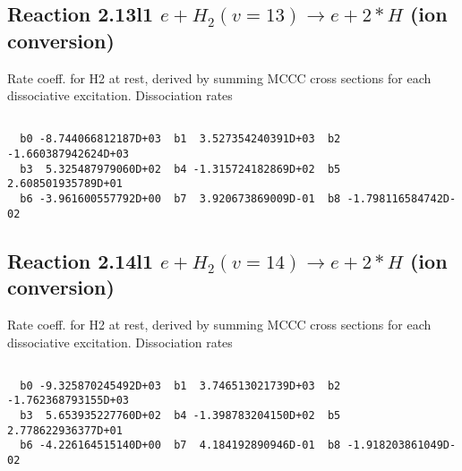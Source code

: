 \newpage
\subsection{
Reaction 2.13l1
$ e + H_2(v=13) \rightarrow e + 2*H $ (ion conversion)
}
Rate coeff. for H2 at rest, derived by summing MCCC cross sections for each dissociative excitation.
Dissociation rates 

\begin{small}\begin{verbatim}

  b0 -8.744066812187D+03  b1  3.527354240391D+03  b2 -1.660387942624D+03
  b3  5.325487979060D+02  b4 -1.315724182869D+02  b5  2.608501935789D+01
  b6 -3.961600557792D+00  b7  3.920673869009D-01  b8 -1.798116584742D-02

\end{verbatim}\end{small}

\newpage
\subsection{
Reaction 2.14l1
$ e + H_2(v=14) \rightarrow e + 2*H $ (ion conversion)
}
Rate coeff. for H2 at rest, derived by summing MCCC cross sections for each dissociative excitation.
Dissociation rates 

\begin{small}\begin{verbatim}

  b0 -9.325870245492D+03  b1  3.746513021739D+03  b2 -1.762368793155D+03
  b3  5.653935227760D+02  b4 -1.398783204150D+02  b5  2.778622936377D+01
  b6 -4.226164515140D+00  b7  4.184192890946D-01  b8 -1.918203861049D-02

\end{verbatim}\end{small}

\newpage
